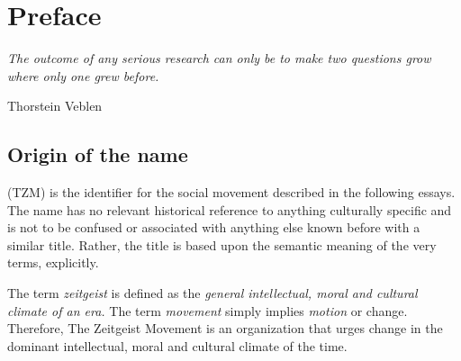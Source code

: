 \documentclass[10pt, a4paper, cleardoubleempty, openright, twoside]{book}
\begin{document}
\cleardoublepage


\pagestyle{fancy}

\renewcommand{\headrulewidth}{0.5pt}
\renewcommand{\footrulewidth}{0.5pt}

\fancyhead{}
\renewcommand{\chaptermark}[1] {
	\fancyhead[LO]{}
	\fancyhead[RE]{\sc\thechapter\space#1}
}
\renewcommand{\sectionmark}[1]{
		\fancyhead[LO]{\sc\thesection\space#1}
	}
\fancyfoot{}
\fancyfoot[RO,LE]{\small\thepage}

 {
	\fancyhead{}
	\renewcommand{\headrulewidth}{0pt}
	\fancyfoot{}
	\fancyfoot[RO,LE]{\thepage}
}

 {
	\fancyhead{}
	\renewcommand{\headrulewidth}{0pt}
	\renewcommand{\footrulewidth}{0pt}
	\fancyfoot{}
}

\setcounter{page}{1}%
\pagestyle{fancy}

\tableofcontents
\listoffigures
\listoftables
\cleardoublepage

\chapter {Preface}
\epigraph{\itshape
	The outcome of any serious research can only be to make two questions
	grow where only one grew before.
}{Thorstein Veblen~\cite{Veblen:UCC:08}}

\section* {Origin of the name}

\emph{} (TZM) is the identifier for
the social movement described in the following essays. The name has no
relevant historical reference to anything culturally specific and is not
to be confused or associated with anything else known before with a
similar title. Rather, the title is based upon the semantic meaning of
the very terms, explicitly.

The term \emph{zeitgeist} is defined as the \emph{general intellectual,
moral and cultural climate of an era.} The term \emph{movement} simply
implies \emph{motion} or change. Therefore, The Zeitgeist Movement is an
organization that urges change in the dominant intellectual, moral and
cultural climate of the time.

\end{document}
